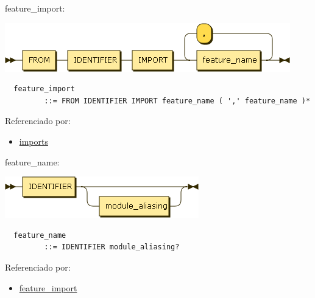 \begin{minipage}{\textwidth}
  \protect\hypertarget{feature_import}{}{feature\_import:}

  \includegraphics[width=4.87500in,height=0.83333in]{diagram/feature_import.png}

  \begin{verbatim}
  feature_import
         ::= FROM IDENTIFIER IMPORT feature_name ( ',' feature_name )*
  \end{verbatim}

  Referenciado por:

  \begin{itemize}
      \tightlist%
    \item
      \protect\hyperlink{imports}{imports}
  \end{itemize}

\end{minipage}

\begin{minipage}{\textwidth}
  \protect\hypertarget{feature_name}{}{feature\_name:}

  \includegraphics[width=3.31250in,height=0.70833in]{diagram/feature_name.png}

  \begin{verbatim}
  feature_name
         ::= IDENTIFIER module_aliasing?
  \end{verbatim}

  Referenciado por:

  \begin{itemize}
      \tightlist%
    \item
      \protect\hyperlink{feature_import}{feature\_import}
  \end{itemize}

\end{minipage}

